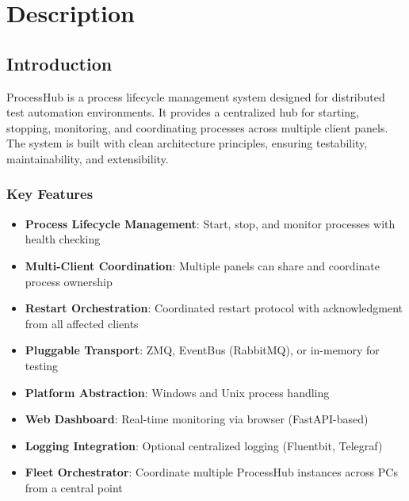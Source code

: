 %
%
%
%
%

\section{Description}

\subsection{Introduction}

ProcessHub is a process lifecycle management system designed for distributed test automation environments.
It provides a centralized hub for starting, stopping, monitoring, and coordinating processes across multiple
client panels. The system is built with clean architecture principles, ensuring testability, maintainability,
and extensibility.

\subsubsection{Key Features}

\begin{itemize}
   \item \textbf{Process Lifecycle Management}: Start, stop, and monitor processes with health checking
   \item \textbf{Multi-Client Coordination}: Multiple panels can share and coordinate process ownership
   \item \textbf{Restart Orchestration}: Coordinated restart protocol with acknowledgment from all affected clients
   \item \textbf{Pluggable Transport}: ZMQ, EventBus (RabbitMQ), or in-memory for testing
   \item \textbf{Platform Abstraction}: Windows and Unix process handling
   \item \textbf{Web Dashboard}: Real-time monitoring via browser (FastAPI-based)
   \item \textbf{Logging Integration}: Optional centralized logging (Fluentbit, Telegraf)
   \item \textbf{Fleet Orchestrator}: Coordinate multiple ProcessHub instances across PCs from a central point
\end{itemize}

